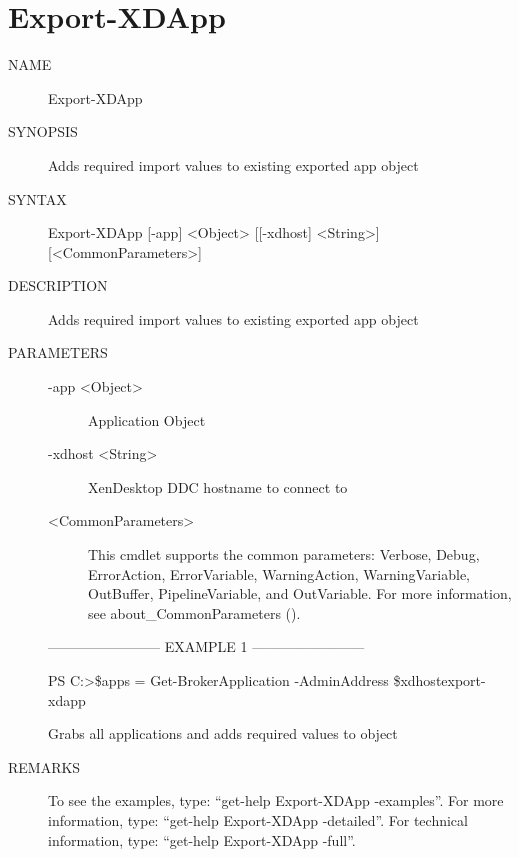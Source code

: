 \documentclass[letterpaper,10pt,english]{sphinxmanual}
\begin{document}
\section{Export-XDApp}
\label{\detokenize{cmd_export:export-xdapp}}\begin{description}
\item[{NAME}] \leavevmode
Export-XDApp

\item[{SYNOPSIS}] \leavevmode
Adds required import values to existing exported app object

\item[{SYNTAX}] \leavevmode
Export-XDApp {[}-app{]} \textless{}Object\textgreater{} {[}{[}-xdhost{]} \textless{}String\textgreater{}{]} {[}\textless{}CommonParameters\textgreater{}{]}

\item[{DESCRIPTION}] \leavevmode
Adds required import values to existing exported app object

\item[{PARAMETERS}] \leavevmode\begin{description}
\item[{-app \textless{}Object\textgreater{}}] \leavevmode
Application Object

\item[{-xdhost \textless{}String\textgreater{}}] \leavevmode
XenDesktop DDC hostname to connect to

\item[{\textless{}CommonParameters\textgreater{}}] \leavevmode
This cmdlet supports the common parameters: Verbose, Debug,
ErrorAction, ErrorVariable, WarningAction, WarningVariable,
OutBuffer, PipelineVariable, and OutVariable. For more information, see
about\_CommonParameters ().

\end{description}

————————\textendash{} EXAMPLE 1 ————————\textendash{}

PS C:\textgreater{}\$apps = Get-BrokerApplication -AdminAddress \$xdhost\textbar{}export-xdapp

Grabs all applications and adds required values to object

\item[{REMARKS}] \leavevmode
To see the examples, type: “get-help Export-XDApp -examples”.
For more information, type: “get-help Export-XDApp -detailed”.
For technical information, type: “get-help Export-XDApp -full”.

\end{description}
\end{document}
